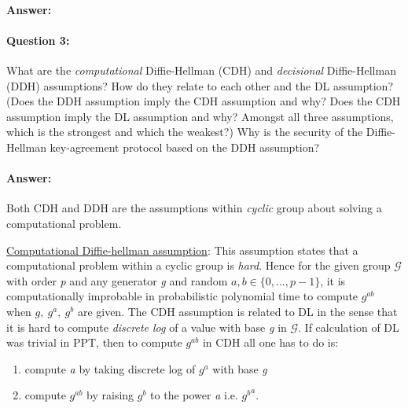 \documentclass{article}
\begin{document}
    \paragraph{Answer: \newline}
        
        
    \paragraph{Question 3:} What are the \emph{computational} Diffie-Hellman (CDH) and \emph{decisional} Diffie-Hellman (DDH) assumptions? How do they relate to each other and the DL assumption? (Does the DDH assumption imply the CDH assumption and why? Does the CDH assumption imply the DL assumption and why? Amongst all three assumptions, which is the strongest and which the weakest?) Why is the security of the Diffie-Hellman key-agreement protocol based on the DDH assumption?
    \paragraph{Answer: \newline}
        Both CDH and DDH are the assumptions within \emph{cyclic} group about solving a computational problem. \newline
        
        \underline{Computational Diffie-hellman assumption}: This assumption states that a computational problem within a cyclic group is \emph{hard}. Hence for the given group $\mathcal{G}$ with order \emph{p} and any generator \emph{g} and random $a, b \in \{0, ... , p-1\}$, it is computationally improbable in probabilistic polynomial time to compute $g^{ab}$ when $g,\ g^a,\ g^b$ are given. \newline
        The CDH assumption is related to DL in the sense that it is hard to compute \emph{discrete log} of a value with base \emph{g} in $\mathcal{G}$. If calculation of DL was trivial in PPT, then to compute $g^{ab}$ in CDH all one has to do is:\newline
        \begin{enumerate}
            \item compute \emph{a} by taking discrete log of $g^a$ with base \emph{g}
            \item compute $g^{ab}$ by raising $g^b$ to the power \emph{a} i.e. ${g^b}^a$.
        \end{enumerate}
        
\end{document}
